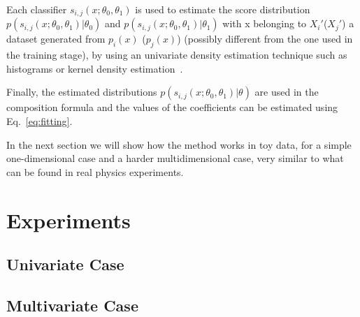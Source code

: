 \documentclass[11pt, oneside]{article}   	%
\begin{document}
Each classifier $s_{i,j}(x;\theta_0, \theta_1)$ is used to estimate the score distribution $p(s_{i,j}(x;\theta_0, \theta_1)|\theta_0)$ and $p(s_{i,j}(x;\theta_0, \theta_1)|\theta_1)$ with x belonging to $X_i'$($X_j'$) a dataset generated from $p_i(x)$ ($p_j(x)$) (possibly different from the one used in the training stage), by using an univariate density estimation technique such as histograms or kernel density estimation~\citep{Verkerke:2003ir,Cranmer:2000du}. 

Finally, the estimated distributions $p(s_{i,j}(x;\theta_0, \theta_1)|\theta)$ are used in the composition formula and the values of the coefficients can be estimated using Eq.~\ref{eq:fitting}.



In the next section we will show how the method works in toy data, for a simple one-dimensional case and a harder multidimensional case, very similar to what can be found in real physics experiments.

\section{Experiments}
 
\subsection{Univariate Case}

\subsection{Multivariate Case}





\end{document}
